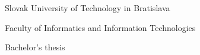 \begin{center}
\thispagestyle{empty}
{\Large Slovak University of Technology in Bratislava}
\par\end{center}{\Large \par}

\begin{center}
{\Large Faculty of Informatics and Information Technologies}
\par\end{center}{\Large \par}

\smallskip{}

\begin{center}
\myEvidenceNumber
\par\end{center}
\vfill{}

\begin{center}
\textbf{\Large \myName}
\par\end{center}{\Large \par}

\medskip{}


\begin{center}
\textbf{\LARGE \myTitle }
\par\end{center}{\huge \par}

\medskip{}


\begin{center}

{\Large Bachelor's thesis}
\par\end{center}{\Large \par}

\vfill{}